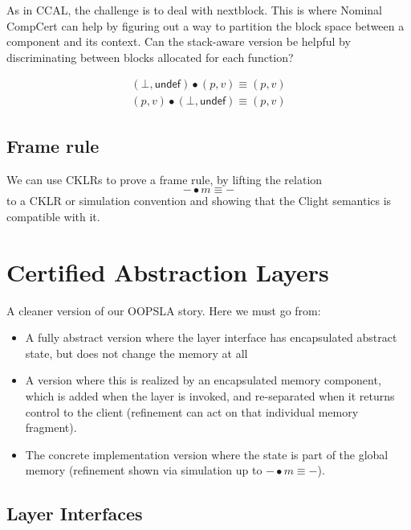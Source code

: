 \documentclass[acmsmall,screen,review,anonymous]{acmart}
\newcommand{\kw}[1]{\ensuremath{ \mathsf{#1} }}
\begin{document}
As in CCAL,
the challenge is to deal with nextblock.
This is where Nominal CompCert can help
by figuring out a way to partition the block space
between a component and its context.
Can the stack-aware version be helpful
by discriminating between blocks allocated
for each function?


\begin{figure}
  \fbox{$\kw{option}\ \kw{perm} \times \kw{memval}$}
  \begin{gather*}
    (\bot, \kw{undef}) \bullet (p, v) \equiv (p, v) \\
    (p, v) \bullet (\bot, \kw{undef}) \equiv (p, v)
  \end{gather*}
\end{figure}

\subsection{Frame rule} %

We can use CKLRs to prove a frame rule,
by lifting the relation
\[
    {-} \bullet m \equiv {-}
\]
to a CKLR or simulation convention
and showing that the Clight semantics
is compatible with it.



\section{Certified Abstraction Layers} %

A cleaner version of our OOPSLA story.
Here we must go from:
\begin{itemize}
  \item A fully abstract version where the layer interface
    has encapsulated abstract state,
    but does not change the memory at all
  \item A version where this is realized by an encapsulated
    memory component,
    which is added when the layer is invoked,
    and re-separated when it returns control to the client
    (refinement can act on that individual memory fragment).
  \item The concrete implementation version
    where the state is part of the global memory
    (refinement shown via
    simulation up to ${-} \bullet m \equiv {-}$).
\end{itemize}

\subsection{Layer Interfaces} %
\end{document}
